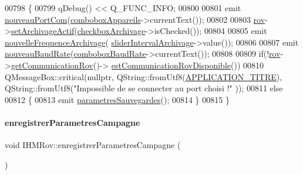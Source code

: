 \begin{DoxyCode}
00798 \{
00799     qDebug() << Q\_FUNC\_INFO;
00800 
00801     emit \hyperlink{class_i_h_m_rov_ae64280b18ebe069c1f64bd5f19ef3a2e}{nouveauPortCom}(\hyperlink{class_i_h_m_rov_a12b970f1d2a170f14a01a684787904a5}{comboboxAppareils}->currentText());
00802 
00803     \hyperlink{class_i_h_m_rov_a777ca33fdb295ba6b6773e880356fa1e}{rov}->\hyperlink{class_rov_abbe2eb87a00b651c8259c0c7abca3edd}{setArchivageActif}(\hyperlink{class_i_h_m_rov_a85be76b5fee7281642db582a79a53511}{checkboxArchivage}->isChecked());
00804 
00805     emit \hyperlink{class_i_h_m_rov_afcfb7f60c126fbaa87cb3f501189cc39}{nouvelleFrequenceArchivage}(
      \hyperlink{class_i_h_m_rov_a8c55c93ee14ee51335e72af07b521312}{sliderIntervalArchivage}->value());
00806 
00807     emit \hyperlink{class_i_h_m_rov_a051d1d8d545e97c6b838df9054dddc6f}{nouveauBaudRate}(\hyperlink{class_i_h_m_rov_a542c0cf87de612cd529b0753b60e4f95}{comboboxBaudRate}->currentText());
00808 
00809     \textcolor{keywordflow}{if}(!\hyperlink{class_i_h_m_rov_a777ca33fdb295ba6b6773e880356fa1e}{rov}->\hyperlink{class_rov_ad30543625f584e28bf785a80c59506dc}{getCommunicationRov}()->
      \hyperlink{class_communication_rov_a513c26b04745fa2ae31b4533d656dfd4}{estCommunicationRovDisponible}())
00810         QMessageBox::critical(\textcolor{keyword}{nullptr}, QString::fromUtf8(\hyperlink{ihmrov_8h_ab599af93fd63f0c5df05b03aa7448eb9}{APPLICATION\_TITRE}), 
      QString::fromUtf8(\textcolor{stringliteral}{"Impossible de se connecter au port choisi !"} ));
00811     \textcolor{keywordflow}{else}
00812     \{
00813         emit \hyperlink{class_i_h_m_rov_accf04daf204c5810c8a6099bb7e37b7e}{parametresSauvegardes}();
00814     \}
00815 \}
\end{DoxyCode}
\mbox{\label{class_i_h_m_rov_a229194814bfb1fc94ab3cc86d6411921}} 
\paragraph{\texorpdfstring{enregistrer\+Parametres\+Campagne}{enregistrerParametresCampagne}}
{\footnotesize\ttfamily void I\+H\+M\+Rov\+::enregistrer\+Parametres\+Campagne (\begin{DoxyParamCaption}{ }\end{DoxyParamCaption})\hspace{0.3cm}{\ttfamily [slot]}}



